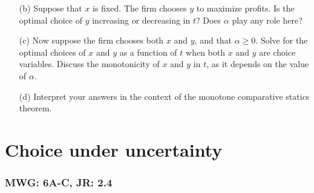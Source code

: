 \documentclass{article}
\begin{document}
\begin{enumerate}
\begin{enumerate}
        \item[(b)] Suppose that \(x\) is fixed. The firm chooses \(y\) to maximize profits. Is the optimal choice of \(y\) increasing or decreasing in \(t\)? Does \(\alpha\) play any role here?
    
        \item[(c)] Now suppose the firm chooses both \(x\) and \(y\), and that \(\alpha \geq 0\). Solve for the optimal choices of \(x\) and \(y\) as a function of \(t\) when both \(x\) and \(y\) are choice variables. Discuss the monotonicity of \(x\) and \(y\) in \(t\), as it depends on the value of \(\alpha\).
    
        \item[(d)] Interpret your answers in the context of the monotone comparative statics theorem.
    \end{enumerate}
\end{enumerate}

\newpage
\section{Choice under uncertainty}\label{choice}
\subsubsection*{MWG: 6A-C, JR: 2.4}
\end{document}
